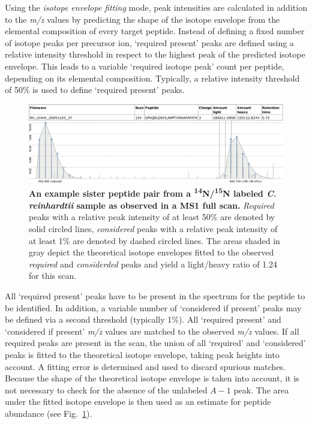 Using the {\em isotope envelope fitting} mode, peak intensities are calculated in 
addition to the {\em m/z} values by predicting the shape of the 
isotope envelope from the elemental composition of every target peptide. 
Instead of defining a fixed number of isotope peaks per precursor ion, `required
present' peaks are defined using a relative intensity threshold in respect to the
highest peak of the predicted isotope envelope.
This leads to a variable `required isotope peak' count per peptide, depending on 
its elemental composition.
Typically, a relative intensity threshold of 50\% is used to define `required 
present' peaks. 

\begin{figure}
\includegraphics[width=\textwidth]{figures/qtrace-figure.jpg}
\caption{
    {\bf An example sister peptide pair from a 
    \textsuperscript{14}N/\textsuperscript{15}N labeled 
    {\em C. reinhardtii} sample as observed in a MS1 full scan. }
    {\em Required} peaks with a relative peak intensity of at least 50\% are 
    denoted by solid circled lines, {\em considered} peaks with a relative peak 
    intensity of at least 1\% are denoted by dashed circled lines. 
    The areas shaded in gray depict the theoretical isotope envelopes fitted to
    the observed {\em required} and {\em considerded} peaks and yield a light/heavy
    ratio of 1.24 for this scan.}
\label{fig:qtrace}
\end{figure}

All `required present' peaks have to be present in the spectrum for the peptide 
to be identified.
In addition, a variable number of `considered if present' peaks may be defined
via a second threshold (typically 1\%). 
All `required present' and `considered if present' {\em m/z} values are matched 
to the observed {\em m/z} values.
If all required peaks are present in the scan, the union of all `required' and
`considered' peaks is fitted to the theoretical isotope envelope, taking peak
heights into account.
A fitting error is determined and used to discard spurious matches.
Because the shape of the theoretical isotope envelope is taken into account, 
it is not necessary to check for the absence of the unlabeled $A-1$ peak.
The area under the fitted isotope envelope is then used as an estimate for
peptide abundance (see Fig.~\ref{fig:qtrace}).

